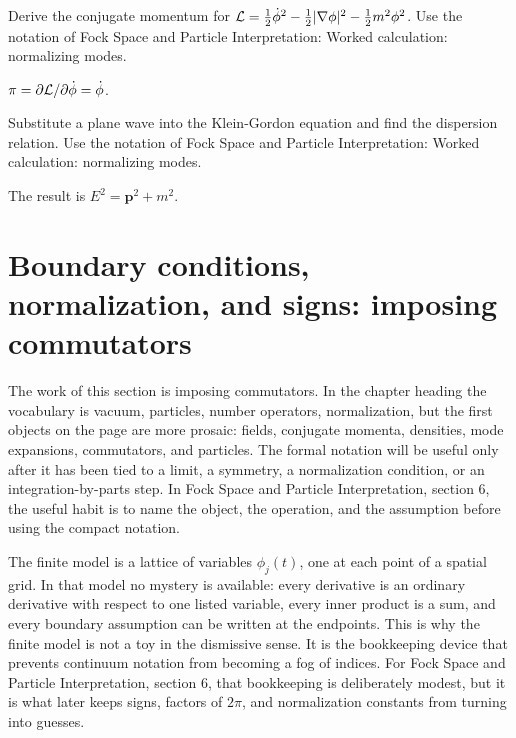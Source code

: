 \begin{exercise}
Derive the conjugate momentum for \(\mathcal L=\frac12\dot\phi^2-\frac12|\nabla\phi|^2-\frac12m^2\phi^2\).  Use the notation of Fock Space and Particle Interpretation: Worked calculation: normalizing modes.
\begin{answer}
\(\pi=\partial\mathcal L/\partial\dot\phi=\dot\phi\).
\end{answer}
\end{exercise}

\begin{exercise}
Substitute a plane wave into the Klein-Gordon equation and find the dispersion relation.  Use the notation of Fock Space and Particle Interpretation: Worked calculation: normalizing modes.
\begin{answer}
The result is \(E^2=\bm p^2+m^2\).
\end{answer}
\end{exercise}



\section{Boundary conditions, normalization, and signs: imposing commutators}

The work of this section is imposing commutators.  In the chapter heading the vocabulary is vacuum, particles, number operators, normalization, but the first objects on the page are more prosaic: fields, conjugate momenta, densities, mode expansions, commutators, and particles.  The formal notation will be useful only after it has been tied to a limit, a symmetry, a normalization condition, or an integration-by-parts step.  In Fock Space and Particle Interpretation, section 6, the useful habit is to name the object, the operation, and the assumption before using the compact notation.

The finite model is a lattice of variables \(\phi_j(t)\), one at each point of a spatial grid.  In that model no mystery is available: every derivative is an ordinary derivative with respect to one listed variable, every inner product is a sum, and every boundary assumption can be written at the endpoints.  This is why the finite model is not a toy in the dismissive sense.  It is the bookkeeping device that prevents continuum notation from becoming a fog of indices.  For Fock Space and Particle Interpretation, section 6, that bookkeeping is deliberately modest, but it is what later keeps signs, factors of \(2\pi\), and normalization constants from turning into guesses.

